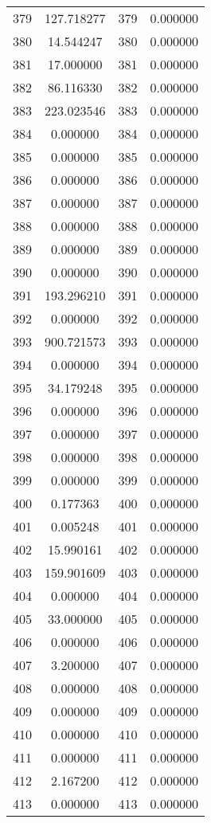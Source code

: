 \documentclass[12pt]{article}
\begin{document}
\begin{longtable}{@{}cccc@{}}
379 & 127.718277 & 379 & 0.000000 \\
380 & 14.544247 & 380 & 0.000000 \\
381 & 17.000000 & 381 & 0.000000 \\
382 & 86.116330 & 382 & 0.000000 \\
383 & 223.023546 & 383 & 0.000000 \\
384 & 0.000000 & 384 & 0.000000 \\
385 & 0.000000 & 385 & 0.000000 \\
386 & 0.000000 & 386 & 0.000000 \\
387 & 0.000000 & 387 & 0.000000 \\
388 & 0.000000 & 388 & 0.000000 \\
389 & 0.000000 & 389 & 0.000000 \\
390 & 0.000000 & 390 & 0.000000 \\
391 & 193.296210 & 391 & 0.000000 \\
392 & 0.000000 & 392 & 0.000000 \\
393 & 900.721573 & 393 & 0.000000 \\
394 & 0.000000 & 394 & 0.000000 \\
395 & 34.179248 & 395 & 0.000000 \\
396 & 0.000000 & 396 & 0.000000 \\
397 & 0.000000 & 397 & 0.000000 \\
398 & 0.000000 & 398 & 0.000000 \\
399 & 0.000000 & 399 & 0.000000 \\
400 & 0.177363 & 400 & 0.000000 \\
401 & 0.005248 & 401 & 0.000000 \\
402 & 15.990161 & 402 & 0.000000 \\
403 & 159.901609 & 403 & 0.000000 \\
404 & 0.000000 & 404 & 0.000000 \\
405 & 33.000000 & 405 & 0.000000 \\
406 & 0.000000 & 406 & 0.000000 \\
407 & 3.200000 & 407 & 0.000000 \\
408 & 0.000000 & 408 & 0.000000 \\
409 & 0.000000 & 409 & 0.000000 \\
410 & 0.000000 & 410 & 0.000000 \\
411 & 0.000000 & 411 & 0.000000 \\
412 & 2.167200 & 412 & 0.000000 \\
413 & 0.000000 & 413 & 0.000000 \\

\end{longtable}
\end{document}
